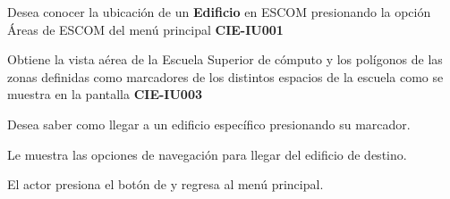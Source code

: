  \begin{UCtrayectoria}
    \UCpaso[\UCactor] Desea conocer la ubicación de un \textbf{Edificio} en ESCOM presionando la opción Áreas de ESCOM del menú principal \textbf{CIE-IU001}

	\UCpaso[\UCsist] Obtiene la vista aérea de la Escuela Superior de cómputo y los polígonos de las zonas definidas como marcadores de los distintos espacios de la escuela como se muestra en la pantalla \textbf{CIE-IU003}

	\UCpaso[\UCactor] Desea saber como llegar a un edificio específico presionando su marcador. 

	\UCpaso[\UCsist] Le muestra las opciones de navegación para llegar del edificio de destino.

	\UCpaso[\UCactor] El actor presiona el botón de  y regresa al menú principal.
 \end{UCtrayectoria}

%    
%   
%   
%    
 

 
%
%
 